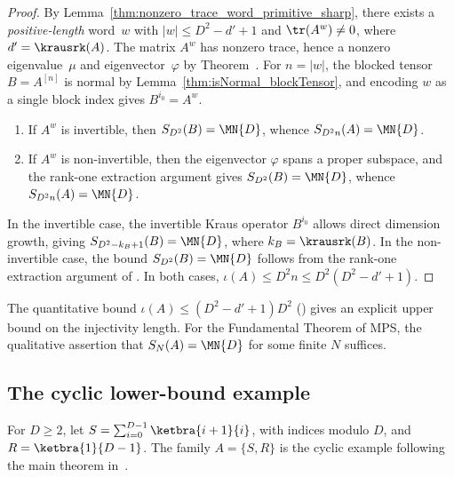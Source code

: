 \begin{proof}
    \leanok
    By Lemma~\ref{thm:nonzero_trace_word_primitive_sharp}, there exists a
    \emph{positive-length} word~$w$ with
    $|w|\le D^2-d'+1$ and $\tr(A^w)\neq0$, where
    $d'=\krausrk(A)$.
    The matrix $A^w$ has nonzero trace, hence a nonzero eigenvalue~$\mu$
    and eigenvector~$\varphi$ by
    Theorem~\cite[``Nonzero trace implies eigenvector'']{QICLean2026Blueprint}.
    For $n=|w|$, the blocked tensor $B=A^{[n]}$ is normal by
    Lemma~\ref{thm:isNormal_blockTensor}, and encoding $w$ as a single block
    index gives $B^{i_0}=A^w$.
    \begin{enumerate}
        \item If $A^w$ is invertible, then
              $S_{D^2}(B)=\MN{D}$, whence
              $S_{D^2n}(A)=\MN{D}$.
        \item If $A^w$ is non-invertible, then the eigenvector $\varphi$
              spans a proper subspace, and the rank-one extraction argument
              gives $S_{D^2}(B)=\MN{D}$, whence
              $S_{D^2n}(A)=\MN{D}$.
    \end{enumerate}
    In the invertible case, the invertible Kraus operator $B^{i_0}$ allows
    direct dimension growth, giving
    $S_{D^2-k_B+1}(B)=\MN{D}$, where $k_B=\krausrk(B)$.
    In the non-invertible case, the bound $S_{D^2}(B)=\MN{D}$ follows from
    the rank-one extraction argument of \cite[Lemma~2(b)]{Sanz2010Quantum}.
    In both cases, $\iota(A)\le D^2n\le D^2(D^2-d'+1)$.
\end{proof}

\begin{remark}%
    \leanok
    The quantitative bound $\iota(A)\le(D^2-d'+1)D^2$
    (\cite[Theorem~1, case~(1)]{Sanz2010Quantum}) gives an explicit upper bound
    on the injectivity length. For the Fundamental Theorem of MPS, the
    qualitative assertion that $S_N(A)=\MN{D}$ for some finite $N$ suffices.
\end{remark}

\subsection{The cyclic lower-bound example}

\begin{definition}
    \label{def:cyclic_wielandt_family}
    \leanok
    For $D\ge2$, let $S=\sum_{i=0}^{D-1}\ketbra{i+1}{i}$, with indices
    modulo $D$, and $R=\ketbra{1}{D-1}$. The family $A=\{S,R\}$ is the
    cyclic example following the main theorem in~\cite{Sanz2010Quantum}.
\end{definition}

